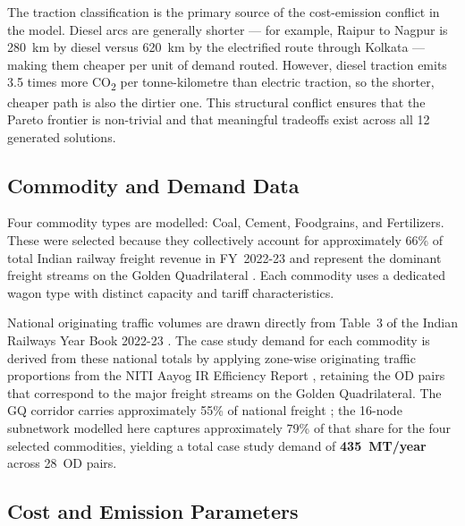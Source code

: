 \documentclass[11pt, a4paper]{article}
\numberwithin{equation}{section}
\numberwithin{figure}{section}
\numberwithin{table}{section}
\begin{document}
The traction classification is the primary source of the cost-emission conflict in the
model. Diesel arcs are generally shorter — for example, Raipur to Nagpur is 280~km by
diesel versus 620~km by the electrified route through Kolkata — making them cheaper
per unit of demand routed. However, diesel traction emits 3.5 times more
CO\textsubscript{2} per tonne-kilometre than electric traction, so the shorter, cheaper path is also the dirtier
one. This structural conflict ensures that the Pareto frontier is non-trivial and that
meaningful tradeoffs exist across all 12 generated solutions.

\subsection{Commodity and Demand Data}

Four commodity types are modelled: Coal, Cement, Foodgrains, and Fertilizers. These
were selected because they collectively account for approximately 66\% of total Indian
railway freight revenue in FY~2022-23 and represent the dominant freight streams on the
Golden Quadrilateral \cite{iryearbook2023}. Each commodity uses a dedicated wagon type
with distinct capacity and tariff characteristics.

National originating traffic volumes are drawn directly from Table~3 of the Indian
Railways Year Book 2022-23 \cite{iryearbook2023}. The case study demand for each
commodity is derived from these national totals by applying zone-wise originating
traffic proportions from the NITI Aayog IR Efficiency Report \cite{nitiayog2021},
retaining the OD pairs that correspond to the major freight streams on the Golden
Quadrilateral. The GQ corridor carries approximately 55\% of national freight
\cite{dfccil2023}; the 16-node subnetwork modelled here captures approximately 79\% of
that share for the four selected commodities, yielding a total case study demand of
\textbf{435~MT/year} across 28~OD pairs.

\subsection{Cost and Emission Parameters}
\label{subsec:emission_params}
\end{document}
